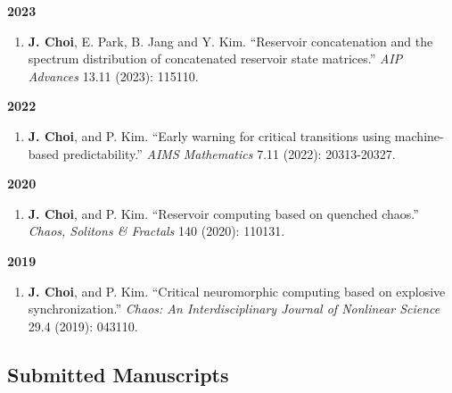 \documentclass[11pt,a4paper]{article}
\begin{document}
\textbf{2023}

\begin{enumerate}[leftmargin=1.5em, topsep=0.2em, itemsep=0.3em, resume]
    \item \textbf{J. Choi}, E. Park, B. Jang and Y. Kim. ``Reservoir concatenation and the spectrum distribution of concatenated reservoir state matrices.'' \textit{AIP Advances} 13.11 (2023): 115110.
\end{enumerate}

\textbf{2022}

\begin{enumerate}[leftmargin=1.5em, topsep=0.2em, itemsep=0.3em, resume]
    \item \textbf{J. Choi}, and P. Kim. ``Early warning for critical transitions using machine-based predictability.'' \textit{AIMS Mathematics} 7.11 (2022): 20313-20327.
\end{enumerate}

\textbf{2020}

\begin{enumerate}[leftmargin=1.5em, topsep=0.2em, itemsep=0.3em, resume]
    \item \textbf{J. Choi}, and P. Kim. ``Reservoir computing based on quenched chaos.'' \textit{Chaos, Solitons \& Fractals} 140 (2020): 110131.
\end{enumerate}

\textbf{2019}

\begin{enumerate}[leftmargin=1.5em, topsep=0.2em, itemsep=0.3em, resume]
    \item \textbf{J. Choi}, and P. Kim. ``Critical neuromorphic computing based on explosive synchronization.'' \textit{Chaos: An Interdisciplinary Journal of Nonlinear Science} 29.4 (2019): 043110.
\end{enumerate}

\subsection*{Submitted Manuscripts}
\end{document}
